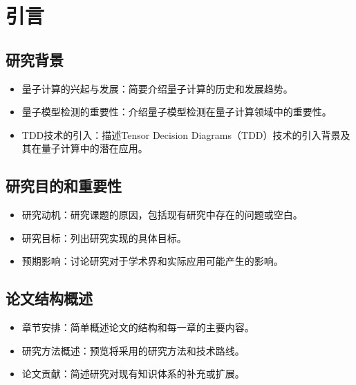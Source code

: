 
\chapter{引言}

\section{研究背景}
\begin{itemize}
  \item 量子计算的兴起与发展：简要介绍量子计算的历史和发展趋势。
  \item 量子模型检测的重要性：介绍量子模型检测在量子计算领域中的重要性。
  \item TDD技术的引入：描述Tensor Decision Diagrams（TDD）技术的引入背景及其在量子计算中的潜在应用。
\end{itemize}

\section{研究目的和重要性}
\begin{itemize}
  \item 研究动机：研究课题的原因，包括现有研究中存在的问题或空白。
  \item 研究目标：列出研究实现的具体目标。
  \item 预期影响：讨论研究对于学术界和实际应用可能产生的影响。
\end{itemize}

\section{论文结构概述}
\begin{itemize}
  \item 章节安排：简单概述论文的结构和每一章的主要内容。
  \item 研究方法概述：预览将采用的研究方法和技术路线。
  \item 论文贡献：简述研究对现有知识体系的补充或扩展。
\end{itemize}
